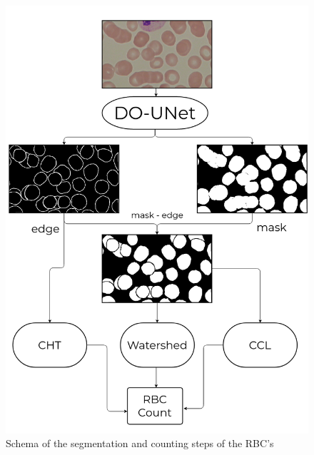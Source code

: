\begin{figure}[H]
\centering
  \vspace{-0.1in}
    \centerline{\includegraphics[width = 7in]{../images/Diag_RBC_DOUNET_SegNet.png}}
    \caption{Schema of the segmentation and counting steps of the RBC's}
    \label{fig:scheme_RBC}
\end{figure}


